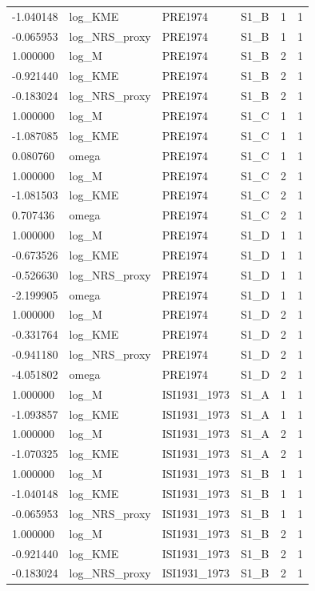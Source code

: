 \begin{tabular}{llllll}
-1.040148 & log\_KME & PRE1974 & S1\_B & 1 & 1 \\
-0.065953 & log\_NRS\_proxy & PRE1974 & S1\_B & 1 & 1 \\
1.000000 & log\_M & PRE1974 & S1\_B & 2 & 1 \\
-0.921440 & log\_KME & PRE1974 & S1\_B & 2 & 1 \\
-0.183024 & log\_NRS\_proxy & PRE1974 & S1\_B & 2 & 1 \\
1.000000 & log\_M & PRE1974 & S1\_C & 1 & 1 \\
-1.087085 & log\_KME & PRE1974 & S1\_C & 1 & 1 \\
0.080760 & omega & PRE1974 & S1\_C & 1 & 1 \\
1.000000 & log\_M & PRE1974 & S1\_C & 2 & 1 \\
-1.081503 & log\_KME & PRE1974 & S1\_C & 2 & 1 \\
0.707436 & omega & PRE1974 & S1\_C & 2 & 1 \\
1.000000 & log\_M & PRE1974 & S1\_D & 1 & 1 \\
-0.673526 & log\_KME & PRE1974 & S1\_D & 1 & 1 \\
-0.526630 & log\_NRS\_proxy & PRE1974 & S1\_D & 1 & 1 \\
-2.199905 & omega & PRE1974 & S1\_D & 1 & 1 \\
1.000000 & log\_M & PRE1974 & S1\_D & 2 & 1 \\
-0.331764 & log\_KME & PRE1974 & S1\_D & 2 & 1 \\
-0.941180 & log\_NRS\_proxy & PRE1974 & S1\_D & 2 & 1 \\
-4.051802 & omega & PRE1974 & S1\_D & 2 & 1 \\
1.000000 & log\_M & ISI1931\_1973 & S1\_A & 1 & 1 \\
-1.093857 & log\_KME & ISI1931\_1973 & S1\_A & 1 & 1 \\
1.000000 & log\_M & ISI1931\_1973 & S1\_A & 2 & 1 \\
-1.070325 & log\_KME & ISI1931\_1973 & S1\_A & 2 & 1 \\
1.000000 & log\_M & ISI1931\_1973 & S1\_B & 1 & 1 \\
-1.040148 & log\_KME & ISI1931\_1973 & S1\_B & 1 & 1 \\
-0.065953 & log\_NRS\_proxy & ISI1931\_1973 & S1\_B & 1 & 1 \\
1.000000 & log\_M & ISI1931\_1973 & S1\_B & 2 & 1 \\
-0.921440 & log\_KME & ISI1931\_1973 & S1\_B & 2 & 1 \\
-0.183024 & log\_NRS\_proxy & ISI1931\_1973 & S1\_B & 2 & 1 \\

\end{tabular}
